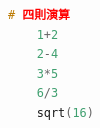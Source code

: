 \begin{lstlisting}[language=c++,label={code:05_01},caption={四則演算のコード}]
	# 四則演算
	1+2
	2-4
	3*5
	6/3
	sqrt(16)
\end{lstlisting}
